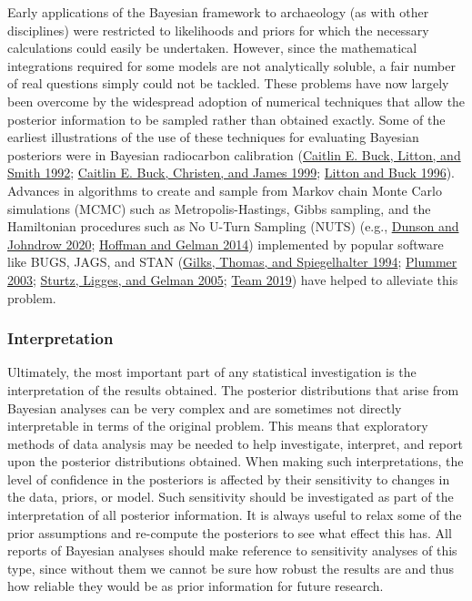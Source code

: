 \documentclass[
]{article}
\begin{document}
Early applications of the Bayesian framework to archaeology (as with
other disciplines) were restricted to likelihoods and priors for which
the necessary calculations could easily be undertaken. However, since
the mathematical integrations required for some models are not
analytically soluble, a fair number of real questions simply could not
be tackled. These problems have now largely been overcome by the
widespread adoption of numerical techniques that allow the posterior
information to be sampled rather than obtained exactly. Some of the
earliest illustrations of the use of these techniques for evaluating
Bayesian posteriors were in Bayesian radiocarbon calibration
(\protect\hyperlink{ref-buck_calibration_1992}{Caitlin E. Buck, Litton,
and Smith 1992}; \protect\hyperlink{ref-buck_bcal_1999}{Caitlin E. Buck,
Christen, and James 1999};
\protect\hyperlink{ref-litton_archaeological_1996}{Litton and Buck
1996}). Advances in algorithms to create and sample from Markov chain
Monte Carlo simulations (MCMC) such as Metropolis-Hastings, Gibbs
sampling, and the Hamiltonian procedures such as No U-Turn Sampling
(NUTS) (e.g., \protect\hyperlink{ref-dunson_hastings_2020}{Dunson and
Johndrow 2020}; \protect\hyperlink{ref-hoffman_no-u-turn_2014}{Hoffman
and Gelman 2014}) implemented by popular software like BUGS, JAGS, and
STAN (\protect\hyperlink{ref-gilks_language_1994}{Gilks, Thomas, and
Spiegelhalter 1994}; \protect\hyperlink{ref-plummer_jags_2003}{Plummer
2003}; \protect\hyperlink{ref-sturtz_r2winbugs_2005}{Sturtz, Ligges, and
Gelman 2005}; \protect\hyperlink{ref-team_rstan_2019}{Team 2019}) have
helped to alleviate this problem.

\hypertarget{interpretation}{%
\subsubsection{Interpretation}\label{interpretation}}

Ultimately, the most important part of any statistical investigation is
the interpretation of the results obtained. The posterior distributions
that arise from Bayesian analyses can be very complex and are sometimes
not directly interpretable in terms of the original problem. This means
that exploratory methods of data analysis may be needed to help
investigate, interpret, and report upon the posterior distributions
obtained. When making such interpretations, the level of confidence in
the posteriors is affected by their sensitivity to changes in the data,
priors, or model. Such sensitivity should be investigated as part of the
interpretation of all posterior information. It is always useful to
relax some of the prior assumptions and re-compute the posteriors to see
what effect this has. All reports of Bayesian analyses should make
reference to sensitivity analyses of this type, since without them we
cannot be sure how robust the results are and thus how reliable they
would be as prior information for future research. \newpage
\end{document}
